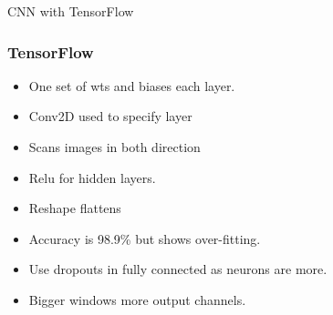 \begin{frame}
  \begin{center}
    {\Large CNN with TensorFlow}
    
  \end{center}
\end{frame}

\begin{frame}[fragile] \frametitle{TensorFlow}


\begin{itemize}
\item One set of wts and biases each layer.
\item Conv2D used to specify layer
\item Scans images in both direction
\item Relu for hidden layers.
\item Reshape flattens
\item Accuracy is 98.9\% but shows over-fitting.
\item Use dropouts in fully connected as neurons are more. 
\item Bigger windows more output channels.
\end{itemize}

\end{frame}

